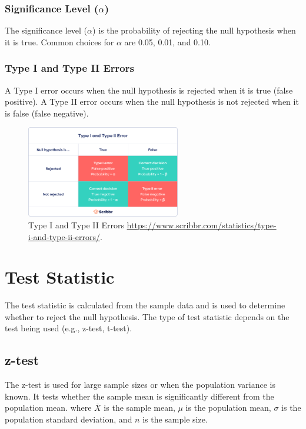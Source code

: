 \subsubsection{Significance Level (\(\alpha\))}
The significance level (\(\alpha\)) is the probability of rejecting the null hypothesis when it is true. Common choices for \(\alpha\) are 0.05, 0.01, and 0.10.

\subsubsection{Type I and Type II Errors}
A Type I error occurs when the null hypothesis is rejected when it is true (false positive). A Type II error occurs when the null hypothesis is not rejected when it is false (false negative).

\begin{figure}[h]
    \centering
    \includegraphics[width=0.6\textwidth]{../images/type-i-and-ii-error-2.png}
    \caption{Type I and Type II Errors
    {\url{https://www.scribbr.com/statistics/type-i-and-type-ii-errors/}}.}
    \label{fig:Type I and Type II Errors}
\end{figure}

\section{Test Statistic}
The test statistic is calculated from the sample data and is used to determine whether to reject the null hypothesis. The type of test statistic depends on the test being used (e.g., z-test, t-test).

\subsection{z-test}
The z-test is used for large sample sizes or when the population variance is known. It tests whether the sample mean is significantly different from the population mean.
where $\bar{X}$ is the sample mean, $\mu$ is the population mean, $\sigma$ is the population standard deviation, and $n$ is the sample size.


